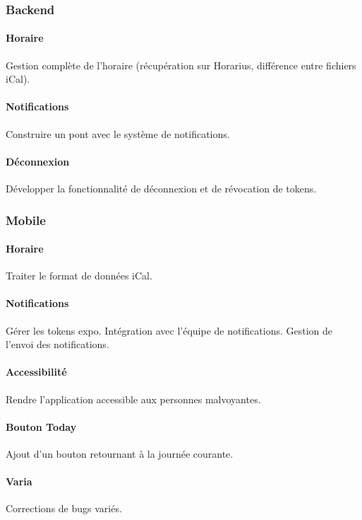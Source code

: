 \subsubsection{Backend}
	\paragraph{Horaire} Gestion complète de l'horaire (récupération sur Horarius, différence entre fichiers iCal).

	\paragraph{Notifications} Construire un pont avec le système de notifications.
	
	\paragraph{Déconnexion} Développer la fonctionnalité de déconnexion et de révocation de tokens.
	
\subsubsection{Mobile}
	\paragraph{Horaire} Traiter le format de données iCal.
	
	\paragraph{Notifications} Gérer les tokens expo. Intégration avec l'équipe de notifications. Gestion de l'envoi des notifications.
	
	\paragraph{Accessibilité} Rendre l'application accessible aux personnes malvoyantes.
	
	\paragraph{Bouton Today} Ajout d'un bouton retournant à la journée courante.
	
	\paragraph{Varia} Corrections de bugs variés.
	
